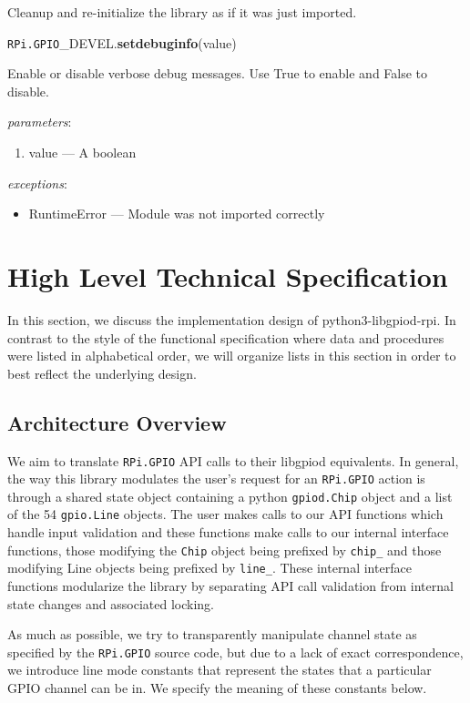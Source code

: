 \documentclass[12pt]{article}
\begin{document}
Cleanup and re-initialize the library as if it was just imported.

\noindent \texttt{RPi.GPIO}\_DEVEL.\textbf{setdebuginfo}(value)
        
Enable or disable verbose debug messages. Use True to enable and False to disable.

\textit{parameters}:
\begin{enumerate}      
        \item value --- A boolean
\end{enumerate}
 

\textit{exceptions}:
\begin{itemize}
    \item RuntimeError --- Module was not imported correctly 
\end{itemize}

\section{High Level Technical Specification}

In this section, we discuss the implementation design of python3-libgpiod-rpi. In contrast to the style of the functional specification where data and procedures were listed in alphabetical order, we will organize lists in this section in order to best reflect the underlying design.

\subsection{Architecture Overview}

We aim to translate \texttt{RPi.GPIO} API calls to their libgpiod equivalents. In general, the way this library modulates the user's request for an \texttt{RPi.GPIO} action is through a shared state object containing a python \texttt{gpiod.Chip} object and a list of the 54 \texttt{gpio.Line} objects. The user makes calls to our API functions which handle input validation and these functions make calls to our internal interface functions, those modifying the \texttt{Chip} object being prefixed by \texttt{chip\_} and those modifying Line objects being prefixed by \texttt{line\_}. These internal interface functions modularize the library by separating API call validation from internal state changes and associated locking.

As much as possible, we try to transparently manipulate channel state as specified by the \texttt{RPi.GPIO} source code, but due to a lack of exact correspondence, we introduce line mode constants that represent the states that a particular GPIO channel can be in. We specify the meaning of these constants below.
\end{document}
